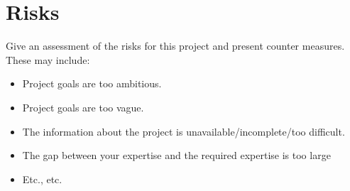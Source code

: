 \chapter{Risks}

Give an assessment of the risks for this project and present counter measures. These may include:
\begin{itemize}
\item Project goals are too ambitious.
\item Project goals are too vague.
\item The information about the project is unavailable/incomplete/too difficult.
\item The gap between your expertise and the required expertise is too large
\item Etc., etc.
\end{itemize}

\lipsum[18]
